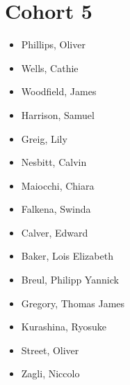 \documentclass{article}
\begin{document}
\section*{Cohort 5}
\begin{itemize}
    \item Phillips, Oliver 
    \item Wells, Cathie \cite{wells2021reducing,wells2022role,capponi2022refining}
    \item Woodfield, James 
    \item Harrison, Samuel \cite{harrison2022identifying} %
    \item Greig, Lily
    \item Nesbitt, Calvin
    \item Maiocchi, Chiara \cite{maiocchi2022decomposing} %
    \item Falkena, Swinda \cite{falkena2021delay, falkena2020revisiting, falkena2022detection} %
    \item Calver, Edward \cite{calver2022hydraulic}
    \item Baker, Lois Elizabeth  \cite{baker2020evolution,baker2021surface,baker2022tao,baker2022impact,mashayek2022marginal} %
    \item Breul, Philipp Yannick \cite{breul2022relationship}
    \item Gregory, Thomas James
    \item Kurashina, Ryosuke \cite{kurashina2021western,harrison2022identifying} %
    \item Street, Oliver \cite{street2021semi,crisan2021wave,crisan2022analytical,crisan2022analytical}%
    \item Zagli, Niccolo \cite{lucarini2020response,zagli2021spectroscopy} %
\end{itemize}

\end{document}
